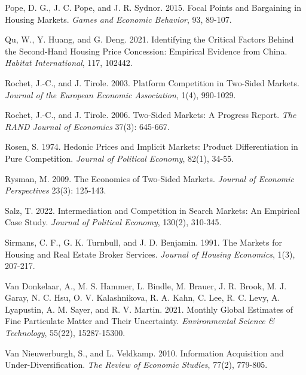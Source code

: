 \documentclass[11pt]{article}
\begin{document}
\begin{singlespace}
\begin{thebibliography}{}
Pope, D. G., J. C. Pope, and J. R. Sydnor. 2015. Focal Points and Bargaining in Housing Markets. \textit{Games and Economic Behavior}, 93, 89-107. 

Qu, W., Y. Huang, and G. Deng. 2021. Identifying the Critical Factors Behind the Second-Hand Housing Price Concession: Empirical Evidence from China. \textit{Habitat International}, 117, 102442. 

Rochet, J.-C., and J. Tirole. 2003. Platform Competition in Two-Sided Markets. \textit{Journal of the European Economic Association}, 1(4), 990-1029. 

Rochet, J.-C., and J. Tirole. 2006. Two-Sided Markets: A Progress Report. \textit{The RAND Journal of Economics} 37(3): 645-667. %

Rosen, S. 1974. Hedonic Prices and Implicit Markets: Product Differentiation in Pure Competition. \textit{Journal of Political Economy}, 82(1), 34-55.%

Rysman, M. 2009. The Economics of Two-Sided Markets. \textit{Journal of Economic Perspectives} 23(3): 125-143. %

Salz, T. 2022. Intermediation and Competition in Search Markets: An Empirical Case Study. \textit{Journal of Political Economy}, 130(2), 310-345. 

Sirmans, C. F., G. K. Turnbull, and J. D. Benjamin. 1991. The Markets for Housing and Real Estate Broker Services. \textit{Journal of Housing Economics}, 1(3), 207-217. 

Van Donkelaar, A., M. S. Hammer, L. Bindle, M. Brauer, J. R. Brook, M. J. Garay, N. C. Hsu, O. V. Kalashnikova, R. A. Kahn, C. Lee, R. C. Levy, A. Lyapustin, A. M. Sayer, and R. V. Martin. 2021. Monthly Global Estimates of Fine Particulate Matter and Their Uncertainty. \textit{Environmental Science \& Technology}, 55(22), 15287-15300. 

Van Nieuwerburgh, S., and L. Veldkamp. 2010. Information Acquisition and Under-Diversification. \textit{The Review of Economic Studies}, 77(2), 779-805. 


\end{thebibliography}
\end{singlespace}
\end{document}
